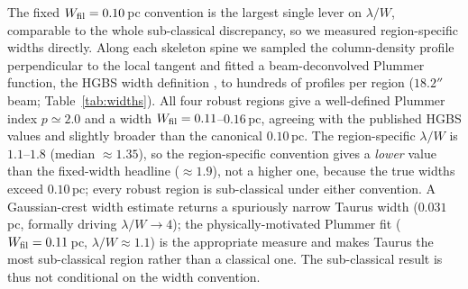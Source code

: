 \documentclass[usenatbib,twoside,twocolumn]{mnras}
\begin{document}
The fixed $W_{\rm fil}=0.10$\,pc convention is the largest single lever on $\lambda/W$, comparable to the whole sub-classical discrepancy, so we measured region-specific widths directly. Along each skeleton spine we sampled the column-density profile perpendicular to the local tangent and fitted a beam-deconvolved Plummer function, the HGBS width definition \citep{Arzoumanian2019}, to hundreds of profiles per region ($18.2''$ beam; Table~\ref{tab:widths}). All four robust regions give a well-defined Plummer index $p\simeq2.0$ and a width $W_{\rm fil}=0.11$--$0.16$\,pc, agreeing with the published HGBS values \citep{Arzoumanian2019} and slightly broader than the canonical $0.10$\,pc. The region-specific $\lambda/W$ is $1.1$--$1.8$ (median $\approx1.35$), so the region-specific convention gives a \emph{lower} value than the fixed-width headline ($\approx1.9$), not a higher one, because the true widths exceed $0.10$\,pc; every robust region is sub-classical under either convention. A Gaussian-crest width estimate returns a spuriously narrow Taurus width ($0.031$\,pc, formally driving $\lambda/W\to4$); the physically-motivated Plummer fit ($W_{\rm fil}=0.11$\,pc, $\lambda/W\approx1.1$) is the appropriate measure and makes Taurus the most sub-classical region rather than a classical one. The sub-classical result is thus not conditional on the width convention.
\end{document}

